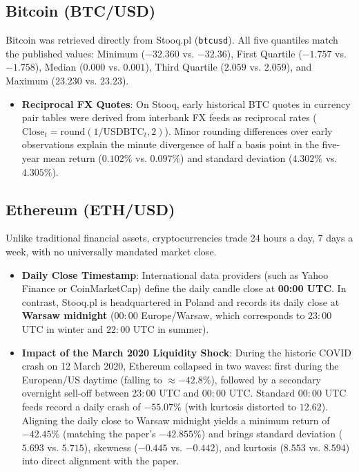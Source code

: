 \documentclass[11pt,a4paper]{article}
\begin{document}
\subsection{Bitcoin (BTC/USD)}
Bitcoin was retrieved directly from Stooq.pl (\texttt{btcusd}). All five quantiles match the published values: Minimum ($-32.360$ vs. $-32.36$), First Quartile ($-1.757$ vs. $-1.758$), Median ($0.000$ vs. $0.001$), Third Quartile ($2.059$ vs. $2.059$), and Maximum ($23.230$ vs. $23.23$).
\begin{itemize}
    \item \textbf{Reciprocal FX Quotes}: On Stooq, early historical BTC quotes in currency pair tables were derived from interbank FX feeds as reciprocal rates ($\text{Close}_t = \text{round}(1/\text{USDBTC}_t, 2)$). Minor rounding differences over early observations explain the minute divergence of half a basis point in the five-year mean return ($0.102\%$ vs. $0.097\%$) and standard deviation ($4.302\%$ vs. $4.305\%$).
\end{itemize}

\subsection{Ethereum (ETH/USD)}
Unlike traditional financial assets, cryptocurrencies trade 24 hours a day, 7 days a week, with no universally mandated market close.
\begin{itemize}
    \item \textbf{Daily Close Timestamp}: International data providers (such as Yahoo Finance or CoinMarketCap) define the daily candle close at \textbf{00:00 UTC}. In contrast, Stooq.pl is headquartered in Poland and records its daily close at \textbf{Warsaw midnight} ($00{:}00$ Europe/Warsaw, which corresponds to $23{:}00$ UTC in winter and $22{:}00$ UTC in summer).
    \item \textbf{Impact of the March 2020 Liquidity Shock}: During the historic COVID crash on 12 March 2020, Ethereum collapsed in two waves: first during the European/US daytime (falling to $\approx -42.8\%$), followed by a secondary overnight sell-off between $23{:}00$ UTC and $00{:}00$ UTC. Standard $00{:}00$ UTC feeds record a daily crash of $-55.07\%$ (with kurtosis distorted to $12.62$). Aligning the daily close to Warsaw midnight yields a minimum return of \textbf{$-42.45\%$} (matching the paper's $-42.855\%$) and brings standard deviation ($5.693$ vs. $5.715$), skewness ($-0.445$ vs. $-0.442$), and kurtosis ($8.553$ vs. $8.594$) into direct alignment with the paper.
\end{itemize}
\end{document}
